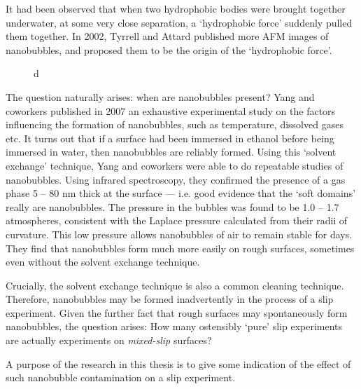 \documentclass[12pt, a4paper, twoside, openright]{book}
\begin{document}
It had been observed that when two hydrophobic bodies were brought together underwater, at some very close separation, a `hydrophobic force' suddenly pulled them together.  In 2002, Tyrrell and Attard published \cite{TyrrellAttard2002} more AFM images of nanobubbles, and proposed them to be the origin of the `hydrophobic force'.

\begin{figure}[ht]
\centering
{}
\caption{d}\label{d}
\end{figure}

The question naturally arises: when are nanobubbles present?  Yang and coworkers published in 2007 \cite{Yang2007} an exhaustive experimental study on the factors influencing the formation of nanobubbles, such as temperature, dissolved gases etc.  It turns out that if a surface had been immersed in ethanol before being immersed in water, then nanobubbles are reliably formed.  Using this `solvent exchange' technique, Yang and coworkers were able to do repeatable studies of nanobubbles.  Using infrared spectroscopy, they confirmed the presence of a gas phase 5 -- 80 nm thick at the surface --- i.e. good evidence that the `soft domains' really are nanobubbles.  The pressure in the bubbles was found to be 1.0 -- 1.7 atmospheres, consistent with the Laplace pressure calculated from their radii of curvature.  This low pressure allows nanobubbles of air to remain stable for days.  They find that nanobubbles form much more easily on rough surfaces, sometimes even without the solvent exchange technique.

Crucially, the solvent exchange technique is also a common cleaning technique.  Therefore, nanobubbles may be formed inadvertently in the process of a slip experiment.  Given the further fact that rough surfaces may spontaneously form nanobubbles, the question arises:  How many ostensibly `pure' slip experiments are actually experiments on \emph{mixed-slip} surfaces?

A purpose of the research in this thesis is to give some indication of the effect of such nanobubble contamination on a slip experiment.
\end{document}
